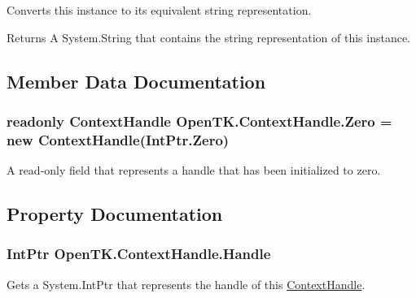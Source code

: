 Converts this instance to its equivalent string representation. 

\begin{DoxyReturn}{Returns}
A System.\-String that contains the string representation of this instance.
\end{DoxyReturn}


\subsection{Member Data Documentation}
\hypertarget{struct_open_t_k_1_1_context_handle_a2f93cb64d85fc3c2669d4726488a8c00}{
\subsubsection[{Zero}]{\setlength{\rightskip}{0pt plus 5cm}readonly {\bf Context\-Handle} Open\-T\-K.\-Context\-Handle.\-Zero = new {\bf Context\-Handle}(Int\-Ptr.\-Zero)\hspace{0.3cm}{\ttfamily [static]}}}\label{struct_open_t_k_1_1_context_handle_a2f93cb64d85fc3c2669d4726488a8c00}


A read-\/only field that represents a handle that has been initialized to zero.



\subsection{Property Documentation}
\hypertarget{struct_open_t_k_1_1_context_handle_aa0cad213b26464434068e1006d587ae7}{
\subsubsection[{Handle}]{\setlength{\rightskip}{0pt plus 5cm}Int\-Ptr Open\-T\-K.\-Context\-Handle.\-Handle\hspace{0.3cm}{\ttfamily [get]}}}\label{struct_open_t_k_1_1_context_handle_aa0cad213b26464434068e1006d587ae7}


Gets a System.\-Int\-Ptr that represents the handle of this \hyperlink{struct_open_t_k_1_1_context_handle}{Context\-Handle}. 

